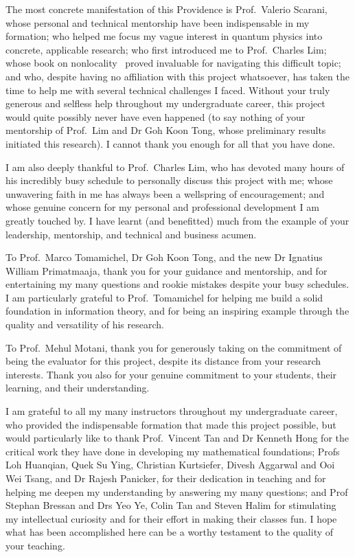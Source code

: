 \documentclass[10pt, a4paper]{article}
\numberwithin{equation}{section} %
\theoremstyle{definition}
\theoremstyle{plain}
\newcommand{\?}{\mathrel{?}} %
\begin{document}
    The most concrete manifestation of this Providence is Prof.\ Valerio Scarani, whose personal and technical mentorship have been indispensable in my formation; who helped me focus my vague interest in quantum physics into concrete, applicable research; who first introduced me to Prof.\ Charles Lim; whose book on nonlocality~\cite{BellNonlocality} proved invaluable for navigating this difficult topic; and who, despite having no affiliation with this project whatsoever, has taken the time to help me with several technical challenges I faced. Without your truly generous and selfless help throughout my undergraduate career, this project would quite possibly never have even happened (to say nothing of your mentorship of Prof.\ Lim and Dr Goh Koon Tong, whose preliminary results initiated this research). I cannot thank you enough for all that you have done.

    I am also deeply thankful to Prof.\ Charles Lim, who has devoted many hours of his incredibly busy schedule to personally discuss this project with me; whose unwavering faith in me has always been a wellspring of encouragement; and whose genuine concern for my personal and professional development I am greatly touched by. I have learnt (and benefitted) much from the example of your leadership, mentorship, and technical and business acumen.

    To Prof.\ Marco Tomamichel, Dr Goh Koon Tong, and the new Dr Ignatius William Primatmaaja, thank you for your guidance and mentorship, and for entertaining my many questions and rookie mistakes despite your busy schedules. I am particularly grateful to Prof.\ Tomamichel for helping me build a solid foundation in information theory, and for being an inspiring example through the quality and versatility of his research.

    To Prof.\ Mehul Motani, thank you for generously taking on the commitment of being the evaluator for this project, despite its distance from your research interests. Thank you also for your genuine commitment to your students, their learning, and their understanding.

    I am grateful to all my many instructors throughout my undergraduate career, who provided the indispensable formation that made this project possible, but would particularly like to thank Prof.\ Vincent Tan and Dr Kenneth Hong for the critical work they have done in developing my mathematical foundations; Profs Loh Huanqian, Quek Su Ying, Christian Kurtsiefer, Divesh Aggarwal and Ooi Wei Tsang, and Dr Rajesh Panicker, for their dedication in teaching and for helping me deepen my understanding by answering my many questions; and Prof Stephan Bressan and Drs Yeo Ye, Colin Tan and Steven Halim for stimulating my intellectual curiosity and for their effort in making their classes fun. I hope what has been accomplished here can be a worthy testament to the quality of your teaching.
\end{document}
